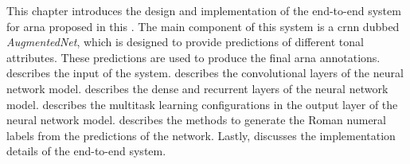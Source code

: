 

This chapter introduces the design and implementation of the
end-to-end system for \gls{arna} proposed in this
\thesisdiss{}. The main component of this system is a
\gls{crnn} dubbed \emph{AugmentedNet}, which is designed to
provide predictions of different tonal attributes. These
predictions are used to produce the final \gls{arna}
annotations.  describes the input of the
system.  describes the
convolutional layers of the neural network model.
 describes the dense and
recurrent layers of the neural network model.
 describes the multitask
learning configurations in the output layer of the neural
network model.
 describes
the methods to generate the Roman numeral labels from the
predictions of the network. Lastly, 
discusses the implementation details of the end-to-end
system.
